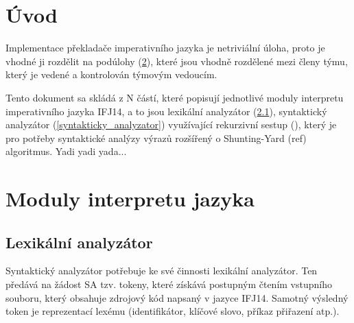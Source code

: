 \documentclass[12pt,a4paper,titlepage,final]{article}
\begin{document}

\def\author{xxx}
\def\email{xxx@stud.fit.vutbr.cz}
\def\projname{Implementace interpretu imperativního jazyka IFJ12}



\pagestyle{plain}
\setcounter{page}{1}
\tableofcontents

\newpage
\pagestyle{plain}
\setcounter{page}{1}

\section{Úvod} \label{uvod}
Implementace překladače imperativního jazyka je netriviální úloha, proto je
vhodné ji rozdělit na podúlohy (\ref{moduly_interpretu}), které jsou vhodně rozdělené mezi
členy týmu, který je vedené a kontrolován týmovým vedoucím.

Tento dokument sa skládá z N částí, které popisují jednotlivé moduly
interpretu imperativního jazyka IFJ14, a to jsou lexikální analyzátor
(\ref{lexikalni_analyzator}), syntaktický analyzátor (\ref{syntakticky_analyzator})
využívající rekurzivní sestup (), který je pro potřeby syntaktické
analýzy výrazů rozšířený o Shunting-Yard (ref) algoritmus.
Yadi yadi yada...

\section{Moduly interpretu jazyka} \label{moduly_interpretu}
\subsection{Lexikální analyzátor} \label{lexikalni_analyzator}

Syntaktický analyzátor potřebuje ke své činnosti lexikální analyzátor. Ten
předává na žádost SA tzv. tokeny, které získává postupným čtením vstupního
souboru, který obsahuje zdrojový kód napsaný v jazyce IFJ14.
Samotný výsledný token je reprezentací lexému (identifikátor, klíčové slovo,
příkaz přiřazení atp.).
\end{document}
